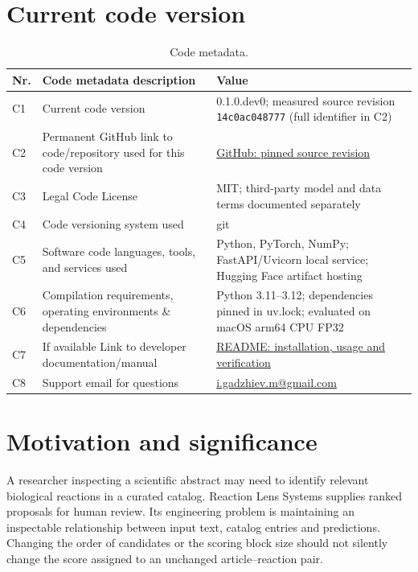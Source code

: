 \documentclass[preprint,12pt,a4paper]{elsarticle}
\begin{document}
\section*{Current code version}
\begin{table}[ht]
\small
\begin{tabularx}{\textwidth}{|l|p{}|X|}
\hline
\textbf{Nr.} & \textbf{Code metadata description} & \textbf{Value} \\
\hline
C1 & Current code version & 0.1.0.dev0; measured source revision \texttt{14c0ac048777} (full identifier in C2) \\
\hline
C2 & Permanent GitHub link to code/repository used for this code version & \href{https://github.com/imrangadzhiev/reaction-lens-systems/tree/14c0ac048777396b121ea877df4f1a08df935a66}{GitHub: pinned source revision} \\
\hline
C3 & Legal Code License & MIT; third-party model and data terms documented separately \\
\hline
C4 & Code versioning system used & git \\
\hline
C5 & Software code languages, tools, and services used & Python, PyTorch, NumPy; FastAPI/Uvicorn local service; Hugging Face artifact hosting \\
\hline
C6 & Compilation requirements, operating environments \& dependencies & Python 3.11--3.12; dependencies pinned in uv.lock; evaluated on macOS arm64 CPU FP32 \\
\hline
C7 & If available Link to developer documentation/manual & \href{https://github.com/imrangadzhiev/reaction-lens-systems/blob/14c0ac048777396b121ea877df4f1a08df935a66/README.md}{README: installation, usage and verification} \\
\hline
C8 & Support email for questions & \href{mailto:i.gadzhiev.m@gmail.com}{i.gadzhiev.m@gmail.com} \\
\hline
\end{tabularx}
\caption{Code metadata.}
\end{table}
\section{Motivation and significance}
A researcher inspecting a scientific abstract may need to identify relevant
biological reactions in a curated catalog. Reaction Lens Systems supplies ranked proposals
for human review. Its engineering problem is maintaining an
inspectable relationship between input text, catalog entries and predictions.
Changing the order of candidates or the scoring block size should not silently
change the score assigned to an unchanged article--reaction pair.
\end{document}
